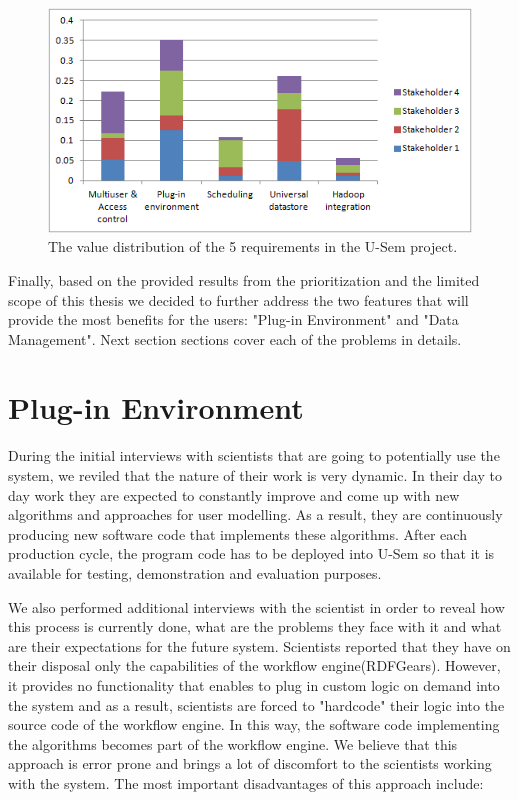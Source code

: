 \begin{figure}[h!]
  \centering
      \includegraphics{requirements/value_diagram.png}
  \caption{The value distribution of the 5 requirements in the U-Sem project.}
\end{figure}


Finally, based on the provided results from the prioritization and the limited scope of this thesis we decided to further address the two features that will provide the most benefits for the users: "Plug-in Environment" and "Data Management". Next section sections cover each of the problems in details.

\section{Plug-in Environment}
\label{sec:problemDefPlugin}

During the initial interviews with scientists that are going to potentially use the system, we reviled that the nature of their work is very dynamic. In their day to day work they are expected to constantly improve and come up with new algorithms and approaches for user modelling. As a result, they are continuously producing new software code that implements these algorithms. After each production cycle, the program code has to be deployed into U-Sem so that it is available for testing, demonstration and evaluation purposes.

We also performed additional interviews with the scientist in order to reveal how this process is currently done, what are the problems they face with it and what are their expectations for the future system. Scientists reported that they have on their disposal only the capabilities of the workflow engine(RDFGears). However, it provides no functionality that enables to plug in custom logic on demand into the system and as a result, scientists are forced to "hardcode" their logic into the source code of the workflow engine. In this way, the software code implementing the algorithms becomes part of the workflow engine. We believe that this approach is error prone and brings a lot of discomfort to the scientists working with the system. The most important disadvantages of this approach include:

